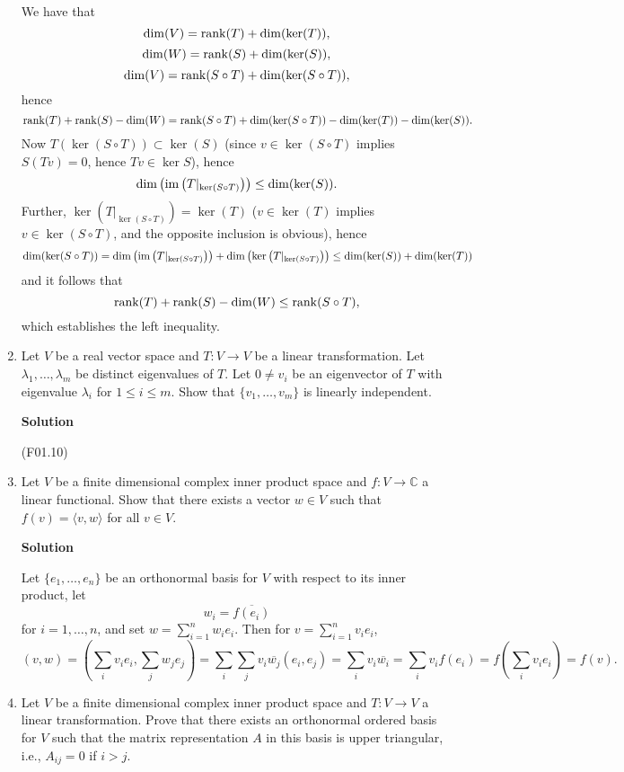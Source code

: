 \documentclass{article}
\def\rank{\mathop{\rm rank}\nolimits}
\def\im{\mathop{\rm im}\nolimits}
\begin{document}
\begin{enumerate}
We have that
\[\dim(V) = \rank(T) + \dim(\ker(T)),\]
\[\dim(W) = \rank(S) + \dim(\ker(S)),\]
\[\dim(V) = \rank(S \circ T) + \dim(\ker(S \circ T)),\]
hence
\[\rank(T) + \rank(S) - \dim(W) = \rank(S \circ T) + \dim(\ker(S \circ T)) - \dim(\ker(T)) - \dim(\ker(S)).\]
Now \(T(\ker(S \circ T)) \subset \ker(S)\) (since \(v \in \ker(S \circ T)\) implies \(S(Tv) = 0\), hence \(Tv \in \ker S\)), hence
\[\dim \left( \im \left( T|_{\ker(S \circ T)} \right) \right) \leq \dim(\ker(S)).\]
Further, \(\ker \left( T|_{\ker(S \circ T)} \right) = \ker(T)\) (\(v \in \ker(T)\) implies \(v \in \ker(S \circ T)\), and the opposite inclusion is obvious), hence
\[\dim(\ker(S \circ T))
     = \dim \left( \im  \left( T|_{\ker(S \circ T)} \right) \right)
     + \dim \left( \ker \left( T|_{\ker(S \circ T)} \right) \right)
  \leq \dim(\ker(S)) + \dim(\ker(T))\]
and it follows that
\[\rank(T) + \rank(S) - \dim(W) \leq \rank(S \circ T),\]
which establishes the left inequality.



\item Let \(V\) be a real vector space and \(T : V \to V\) be a linear transformation.  Let \(\lambda_1, \ldots, \lambda_m\) be distinct eigenvalues of \(T\).  Let \(0 \neq v_i\) be an eigenvector of \(T\) with eigenvalue \(\lambda_i\) for \(1 \leq i \leq m\).  Show that \(\{v_1, \ldots, v_m\}\) is linearly independent.

{\bf Solution}

(F01.10)



\item Let \(V\) be a finite dimensional complex inner product space and \(f : V \to \mathbb{C}\) a linear functional.  Show that there exists a vector \(w \in V\) such that \(f(v) = \langle v, w \rangle\) for all \(v \in V\).

{\bf Solution}

Let \(\{e_1, \ldots, e_n\}\) be an orthonormal basis for \(V\) with respect to its inner product, let
\[w_i = \overline{f(e_i)}\]
for \(i = 1, \ldots, n\), and set \(w = \sum_{i = 1}^n w_i e_i\).  Then for \(v = \sum_{i = 1}^n v_i e_i\),
\[(v,w) = \left( \sum_i v_i e_i, \sum_j w_j e_j \right)
        = \sum_i \sum_j v_i \overline{w_j} (e_i, e_j)
        = \sum_i v_i \overline{w_i}
        = \sum_i v_i f(e_i)
        = f \left( \sum_i v_i e_i \right)
        = f(v).\]



\item Let \(V\) be a finite dimensional complex inner product space and \(T : V \to V\) a linear transformation.  Prove that there exists an orthonormal ordered basis for \(V\) such that the matrix representation \(A\) in this basis is upper triangular, i.e., \(A_{ij} = 0\) if \(i > j\).


\end{enumerate}
\end{document}
